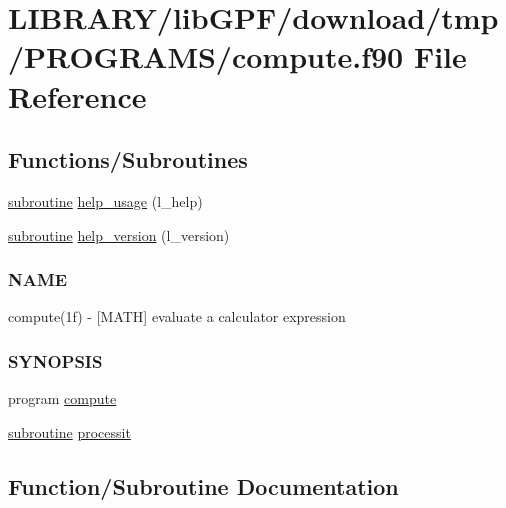 \hypertarget{compute_8f90}{}\section{L\+I\+B\+R\+A\+R\+Y/lib\+G\+P\+F/download/tmp/\+P\+R\+O\+G\+R\+A\+M\+S/compute.f90 File Reference}
\label{compute_8f90}
\subsection*{Functions/\+Subroutines}
\begin{DoxyCompactItemize}
\item 
\hyperlink{M__stopwatch_83_8txt_acfbcff50169d691ff02d4a123ed70482}{subroutine} \hyperlink{compute_8f90_a3e09a3b52ee8fb04eeb93fe5761626a8}{help\+\_\+usage} (l\+\_\+help)
\item 
\hyperlink{M__stopwatch_83_8txt_acfbcff50169d691ff02d4a123ed70482}{subroutine} \hyperlink{compute_8f90_a39c21619b08a3c22f19e2306efd7f766}{help\+\_\+version} (l\+\_\+version)
\begin{DoxyCompactList}\small\item\em \subsubsection*{N\+A\+ME}

compute(1f) -\/ \mbox{[}M\+A\+TH\mbox{]} evaluate a calculator expression \subsubsection*{S\+Y\+N\+O\+P\+S\+IS}\end{DoxyCompactList}\item 
program \hyperlink{compute_8f90_ad31daef7ea6df41611fcaae1171ce54a}{compute}
\item 
\hyperlink{M__stopwatch_83_8txt_acfbcff50169d691ff02d4a123ed70482}{subroutine} \hyperlink{compute_8f90_a6b077f312d27a28f21803c6d624132b7}{processit}
\end{DoxyCompactItemize}


\subsection{Function/\+Subroutine Documentation}
\mbox{\label{compute_8f90_ad31daef7ea6df41611fcaae1171ce54a}} 

